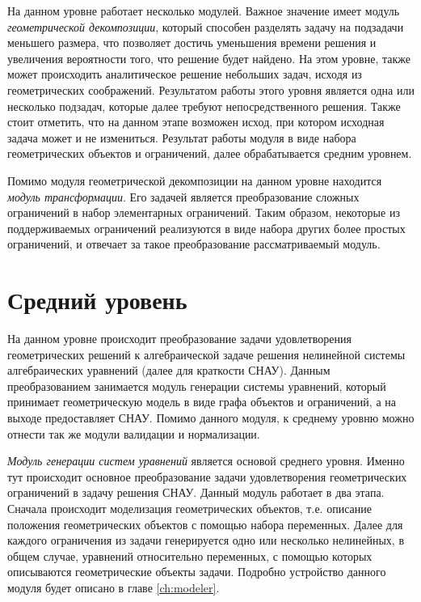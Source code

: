 На данном уровне работает несколько модулей. Важное значение имеет модуль \textit{геометрической декомпозиции}, который способен разделять задачу на подзадачи меньшего размера, что позволяет достичь уменьшения времени решения и увеличения вероятности того, что  решение будет найдено. На этом уровне, также может происходить аналитическое решение небольших задач, исходя из геометрических соображений. Результатом работы этого уровня является одна или несколько подзадач, которые далее требуют непосредственного решения. Также стоит отметить, что на данном этапе возможен исход, при котором исходная задача может и не измениться. Результат работы модуля в виде набора геометрических объектов и ограничений, далее обрабатывается средним уровнем.

Помимо модуля геометрической декомпозиции на данном уровне находится \textit{модуль трансформации}. Его задачей является преобразование сложных ограничений в набор элементарных ограничений. Таким образом, некоторые из поддерживаемых ограничений реализуются в виде набора других более простых ограничений, и отвечает за такое преобразование рассматриваемый модуль. 




\section{Средний уровень}\label{sec:middle_level}
На данном уровне происходит преобразование задачи удовлетворения геометрических решений к алгебраической задаче решения нелинейной системы алгебраических уравнений (далее для краткости СНАУ). Данным преобразованием занимается модуль генерации системы уравнений, который принимает геометрическую модель в виде графа объектов и ограничений, а на выходе предоставляет СНАУ. Помимо данного модуля, к среднему уровню можно отнести так же модули валидации и нормализации. 

\textit{Модуль генерации систем уравнений} является основой среднего уровня. Именно тут происходит основное преобразование задачи удовлетворения геометрических ограничений в задачу решения СНАУ. Данный модуль работает в два этапа. Сначала происходит моделизация геометрических объектов, т.е. описание положения геометрических объектов с помощью набора переменных. Далее для каждого ограничения из задачи генерируется одно или несколько нелинейных, в общем случае, уравнений относительно переменных, с помощью которых описываются геометрические объекты задачи. Подробно устройство данного модуля будет описано в главе \ref{ch:modeler}.

